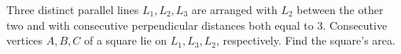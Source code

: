 Three distinct parallel lines $L_1,L_2,L_3$ are arranged with $L_2$ between the other two and with consecutive perpendicular distances both equal to 3. Consecutive vertices $A,B,C$ of a square lie on $L_1,L_3,L_2$, respectively. Find the square's area.
